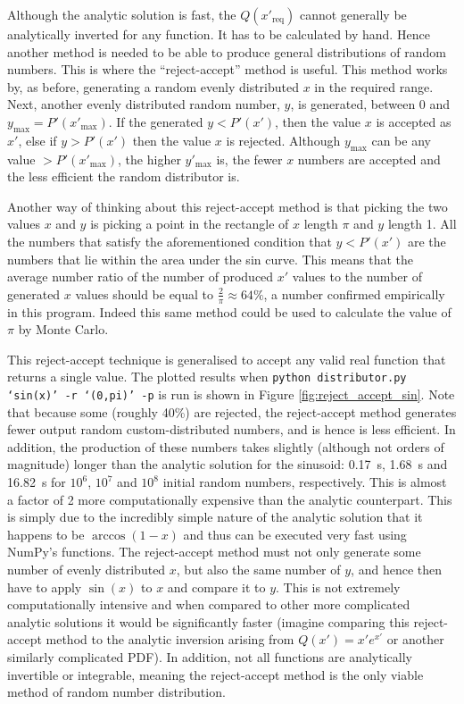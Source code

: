 Although the analytic solution is fast, the $Q(x'_{\text{req}})$ cannot generally be analytically inverted for any function. It has to be calculated by hand. Hence another method is needed to be able to produce general distributions of random numbers. This is where the ``reject-accept'' method is useful. This method works by, as before, generating a random evenly distributed $x$ in the required range. Next, another evenly distributed random number, $y$, is generated, between 0 and $y_{\text{max}} = P'(x'_{\text{max}})$. If the generated $y < P'(x')$, then the value $x$ is accepted as $x'$, else if $y > P'(x')$ then the value $x$ is rejected. Although $y_{\text{max}}$ can be any value $> P'(x'_{\text{max}})$, the higher $y'_{\text{max}}$ is, the fewer $x$ numbers are accepted and the less efficient the random distributor is.

Another way of thinking about this reject-accept method is that picking the two values $x$ and $y$ is picking a point in the rectangle of $x$ length $\pi$ and $y$ length 1. All the numbers that satisfy the aforementioned condition that $y < P'(x')$ are the numbers that lie within the area under the sin curve. This means that the average number ratio of the number of produced $x'$ values to the number of generated $x$ values should be equal to $\frac{2}{\pi} \approx 64\%$, a number confirmed empirically in this program. Indeed this same method could be used to calculate the value of $\pi$ by Monte Carlo.

This reject-accept technique is generalised to accept any valid real function that returns a single value. The plotted results when \texttt{python distributor.py `sin(x)' -r `(0,pi)' -p} is run is shown in Figure \ref{fig:reject_accept_sin}. Note that because some (roughly 40\%) are rejected, the reject-accept method generates fewer output random custom-distributed numbers, and is hence is less efficient. In addition, the production of these numbers takes slightly (although not orders of magnitude) longer than the analytic solution for the sinusoid: \SI{0.17}{\second}, \SI{1.68}{\second} and \SI{16.82}{\second} for $10^6$, $10^7$ and $10^8$ initial random numbers, respectively. This is almost a factor of 2 more computationally expensive than the analytic counterpart. This is simply due to the incredibly simple nature of the analytic solution that it happens to be $\arccos(1-x)$ and thus can be executed very fast using NumPy's functions. The reject-accept method must not only generate some number of evenly distributed $x$, but also the same number of $y$, and hence then have to apply $\sin(x)$ to $x$ and compare it to $y$. This is not extremely computationally intensive and when compared to other more complicated analytic solutions it would be significantly faster (imagine comparing this reject-accept method to the analytic inversion arising from $Q(x') = x'e^{x'}$ or another similarly complicated PDF). In addition, not all functions are analytically invertible or integrable, meaning the reject-accept method is the only viable method of random number distribution.

